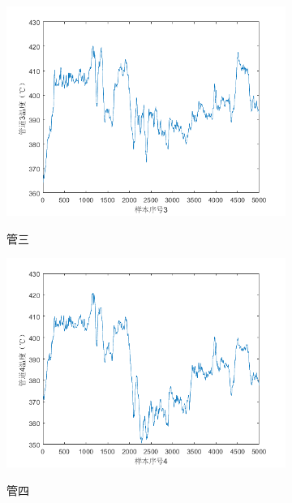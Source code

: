 \begin{figure}[H]
\begin{subfigure}{0.32\textwidth}
                \includegraphics[width=\textwidth]{figures/p1_3.png}
                \label{p1_3}
                \caption{管三}
            \end{subfigure}
            \begin{subfigure}{0.32\textwidth}
                \includegraphics[width=\textwidth]{figures/p1_4.png}
                \label{p1_4}
                \caption{管四}
            \end{subfigure}
            \begin{subfigure}{0.32\textwidth}

\end{subfigure}
\end{figure}

